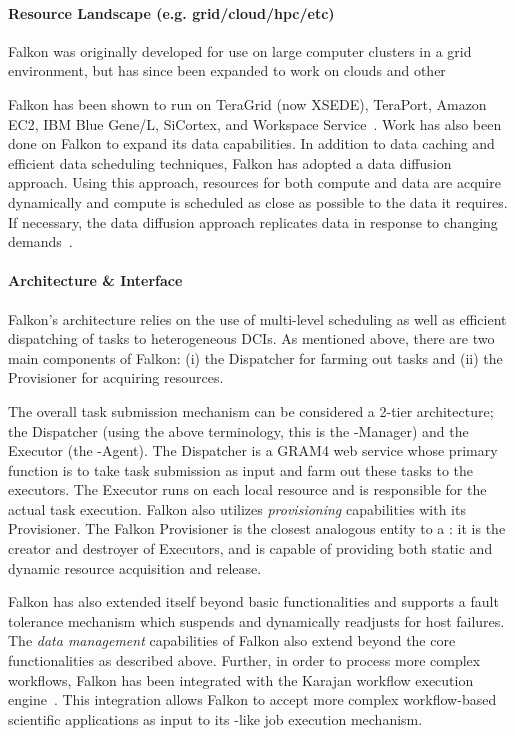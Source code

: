\documentclass{sig-alternate}
\begin{document}
\paragraph{Resource Landscape (e.g. grid/cloud/hpc/etc)}
Falkon was originally developed for use on large computer clusters
in a grid environment, but has since been expanded to work on
clouds and other

Falkon has been
shown to run on TeraGrid (now XSEDE), TeraPort, Amazon EC2, IBM
Blue Gene/L, SiCortex, and Workspace Service~\cite{1362680}.
 Work has also been done on Falkon
to expand its data capabilities. In addition to data caching and
efficient data scheduling techniques, Falkon has adopted a
data diffusion approach. Using this approach, resources for
both compute and data are acquire dynamically and compute
is scheduled as close as possible to the data it requires.
If necessary, the data diffusion approach replicates data
in response to changing demands~\cite{raicu2008accelerating}.


\paragraph{Architecture \& Interface}

Falkon's architecture relies on the use of multi-level scheduling
as well as efficient dispatching of tasks to heterogeneous DCIs.
As mentioned above, there are two main components of Falkon:
(i) the Dispatcher for farming out tasks and
(ii) the Provisioner for acquiring resources.

The overall task submission mechanism can be considered
a 2-tier architecture; the Dispatcher (using the above terminology,
this is the \pilot-Manager) and the Executor (the \pilot-Agent).
The Dispatcher is a GRAM4 web service whose primary
function is to take task submission as input and farm
out these tasks to the executors. The Executor runs on
each local resource and is responsible for the actual
task execution. Falkon also utilizes \textit{provisioning}
capabilities with its Provisioner. The Falkon Provisioner is the
closest analogous entity to a \pilot: it is the creator and
destroyer of Executors, and is capable of
providing both static and dynamic resource
acquisition and release.

Falkon has also extended itself beyond basic \pilotjob functionalities
and supports a fault tolerance mechanism which suspends and
dynamically readjusts for host failures. The \textit{data management}
capabilities of Falkon also extend beyond the core \pilotjob
functionalities as described above. Further, in order
to process more complex workflows, Falkon has been integrated
with the Karajan workflow execution engine~\cite{karajan}. This
integration allows Falkon to accept more complex workflow-based
scientific applications as input to its \pilot-like job execution
mechanism.
\end{document}
